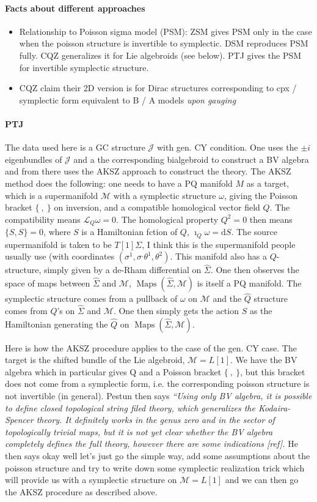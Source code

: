\documentclass{article}
\newcommand{\JJ}{\mathcal{J}}
\newcommand{\MM}{\mathcal{M}}
\newcommand{\bracp}{\{\ ,\ \}}
\newcommand{\Sigmah}{\hat{\Sigma}}
\newcommand{\Lie}{\mathcal{L}}
\newcommand{\rd}{\mathrm{d}}
\theoremstyle{definition}
\theoremstyle{definition}
\theoremstyle{remark}
\theoremstyle{ref}
\DeclareMathOperator{\Maps}{Maps}
\begin{document}
\paragraph*{Facts about different approaches}
\begin{itemize}
\item Relationship to Poisson sigma model (PSM): ZSM gives PSM only in the case when the poisson structure is invertible to symplectic. DSM reproduces PSM fully. CQZ generalizes it for Lie algebroids (see below). PTJ gives the PSM for invertible symplectic structure.
\item CQZ claim their 2D version is for Dirac structures corresponding to cpx / symplectic form equivalent to B / A models {\it upon gauging}
\end{itemize}

\paragraph*{PTJ}
The data used here is a GC structure $\JJ$ with gen. CY condition. One uses the $\pm i$ eigenbundles of $\JJ$ and a the corresponding bialgebroid to construct a BV algebra and from there uses the AKSZ approach to construct the theory. The AKSZ method does the following: one needs to have a PQ manifold $M$ as a target, which is a supermanifold $\MM$ with a symplectic structure $\omega$, giving the Poisson bracket $\{\ ,\ \}$ on inversion, and a compatible homological vector field $Q$. The compatibility means $\Lie_Q\omega=0$. The homological property $Q^2=0$ then means $\{S,S\}=0$, where $S$ is a Hamiltonian fction of $Q$, $\imath_Q\omega=\rd S$. The source supermanifold is taken to be $T[1]\Sigma$, I think this is the supermanifold people usually use (with coordinates $(\sigma^1, \sigma^, \theta^1,\theta^2)$. This manifold also has a $Q$-structure, simply given by a de-Rham differential on $\hat{\Sigma}$. One then observes the space of maps between $\hat{\Sigma}$ and $\MM$, $\Maps(\hat{\Sigma},\MM)$ is itself a PQ manifold. The symplectic structure comes from a pullback of $\omega$ on $\MM$ and the $\hat{Q}$ structure comes from $Q$'s on $\Sigmah$ and $\MM$. One then simply gets the action $S$ as the Hamiltonian generating the $\hat{Q}$ on $\Maps(\hat{\Sigma},\MM)$.

Here is how the AKSZ procedure applies to the case of the gen. CY case. The target is the shifted bundle of the Lie algebroid, $\MM= L[1]$. We have the BV algebra which in particular gives Q and a Poisson bracket $\bracp$, but this bracket does not come from a symplectic form, i.e. the corresponding poisson structure is not invertible (in general). Pestun then says {\it ``Using only BV algebra, it is possible to define closed topological string
filed theory, which generalizes the Kodaira-Spencer theory. It definitely works in the genus zero and in the sector of topologically trivial maps, but it is not yet clear whether
the BV algebra completely defines the full theory, however there are some indications [ref].} He then says okay well let's just go the simple way, add some assumptions about the poisson structure and try to write down some symplectic realization trick which will provide us with a symplectic structure on $\MM=L[1]$ and we can then go the AKSZ procedure as described above.
\end{document}
